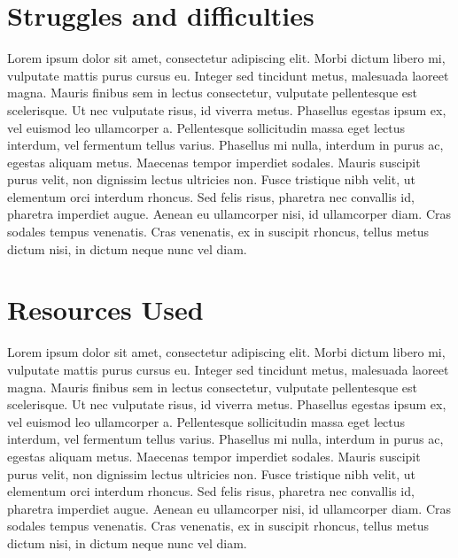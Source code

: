 \documentclass[11pt]{article}
\theoremstyle{definition}
\theoremstyle{remark}
\begin{document}
\section{Struggles and difficulties}
Lorem ipsum dolor sit amet, consectetur adipiscing elit. Morbi dictum libero mi, vulputate mattis purus cursus eu. Integer sed tincidunt metus, malesuada laoreet magna. Mauris finibus sem in lectus consectetur, vulputate pellentesque est scelerisque. Ut nec vulputate risus, id viverra metus. Phasellus egestas ipsum ex, vel euismod leo ullamcorper a. Pellentesque sollicitudin massa eget lectus interdum, vel fermentum tellus varius. Phasellus mi nulla, interdum in purus ac, egestas aliquam metus. Maecenas tempor imperdiet sodales. Mauris suscipit purus velit, non dignissim lectus ultricies non. Fusce tristique nibh velit, ut elementum orci interdum rhoncus. Sed felis risus, pharetra nec convallis id, pharetra imperdiet augue. Aenean eu ullamcorper nisi, id ullamcorper diam. Cras sodales tempus venenatis. Cras venenatis, ex in suscipit rhoncus, tellus metus dictum nisi, in dictum neque nunc vel diam. 

\section{Resources Used}
Lorem ipsum dolor sit amet, consectetur adipiscing elit. Morbi dictum libero mi, vulputate mattis purus cursus eu. Integer sed tincidunt metus, malesuada laoreet magna. Mauris finibus sem in lectus consectetur, vulputate pellentesque est scelerisque. Ut nec vulputate risus, id viverra metus. Phasellus egestas ipsum ex, vel euismod leo ullamcorper a. Pellentesque sollicitudin massa eget lectus interdum, vel fermentum tellus varius. Phasellus mi nulla, interdum in purus ac, egestas aliquam metus. Maecenas tempor imperdiet sodales. Mauris suscipit purus velit, non dignissim lectus ultricies non. Fusce tristique nibh velit, ut elementum orci interdum rhoncus. Sed felis risus, pharetra nec convallis id, pharetra imperdiet augue. Aenean eu ullamcorper nisi, id ullamcorper diam. Cras sodales tempus venenatis. Cras venenatis, ex in suscipit rhoncus, tellus metus dictum nisi, in dictum neque nunc vel diam. 
\end{document}
